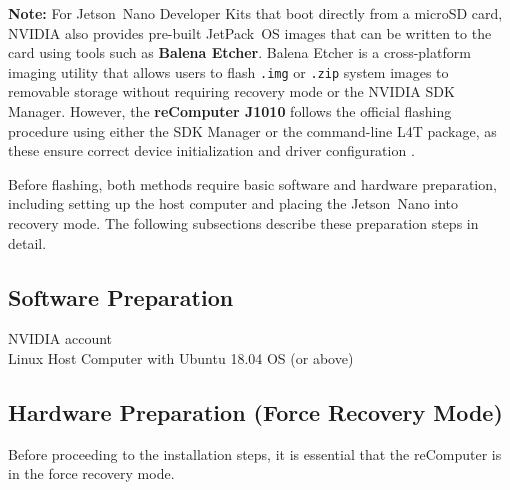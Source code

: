\bigskip
\noindent\textbf{Note:}  
For Jetson~Nano Developer Kits that boot directly from a microSD card, NVIDIA also provides pre-built JetPack~OS images that can be written to the card using tools such as \textbf{Balena Etcher}.  
Balena Etcher is a cross-platform imaging utility that allows users to flash \texttt{.img} or \texttt{.zip} system images to removable storage without requiring recovery mode or the NVIDIA SDK Manager.  
However, the \textbf{reComputer J1010} follows the official flashing procedure using either the SDK Manager or the command-line L4T package, as these ensure correct device initialization and driver configuration \cite{reComputer_FlashGuide,balenaEtcherDoc}.

\bigskip
Before flashing, both methods require basic software and hardware preparation, including setting up the host computer and placing the Jetson~Nano into recovery mode.  
The following subsections describe these preparation steps in detail.


\subsection{Software Preparation}
\label{subsec:software_prep}

NVIDIA account \\
Linux Host Computer with Ubuntu 18.04 OS (or above)

\subsection{Hardware Preparation (Force Recovery Mode)}
\label{subsec:hardware_prep}

Before proceeding to the installation steps, it is essential that the reComputer is in the force recovery mode.

